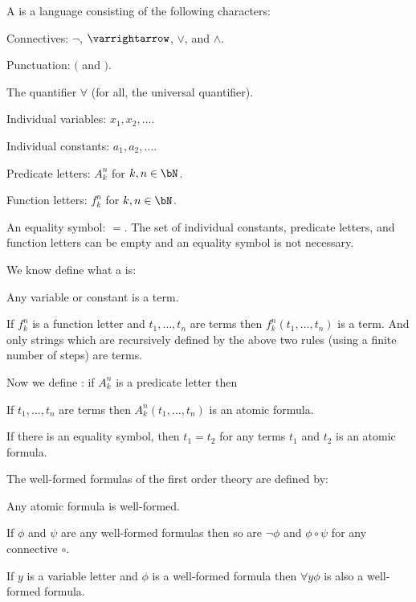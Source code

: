 \documentclass[10pt]{article}
\let\to=\varrightarrow
\begin{document}
\begin{defn*}

    A  is a language consisting of the following characters:
    \benum
        \item Connectives: $\neg$, $\to$, $\lor$, and $\land$.
        \item Punctuation: $($ and $)$.
        \item The quantifier $\forall$ (for all, the universal quantifier).
        \item Individual variables: $x_1,x_2,\dots$.
        \item Individual constants: $a_1,a_2,\dots$.
        \item Predicate letters: $A_k^n$ for $k,n\in\bN$.
        \item Function letters: $f_k^n$ for $k,n\in\bN$.
        \item An equality symbol: $=$.
    \eenum
    The set of individual constants, predicate letters, and function letters can be empty and an equality symbol is not necessary.

    We know define what a  is:
    \benum
        \item Any variable or constant is a term.
        \item If $f_k^n$ is a function letter and $t_1,\dots,t_n$ are terms then $f_k^n(t_1,\dots,t_n)$ is a term.
    \eenum
    And only strings which are recursively defined by the above two rules (using a finite number of steps) are terms.
        
    Now we define : if $A_k^n$ is a predicate letter then
    \benum
        \item If $t_1,\dots,t_n$ are terms then $A_k^n(t_1,\dots,t_n)$ is an atomic formula.
        \item If there is an equality symbol, then $t_1=t_2$ for any terms $t_1$ and $t_2$ is an atomic formula.
    \eenum

    The well-formed formulas of the first order theory are defined by:
    \benum
        \item Any atomic formula is well-formed.
        \item If $\phi$ and $\psi$ are any well-formed formulas then so are $\neg\phi$ and $\phi\circ\psi$ for any connective $\circ$.
        \item If $y$ is a variable letter and $\phi$ is a well-formed formula then $\forall y\phi$ is also a well-formed formula.
    \eenum

\end{defn*}
\end{document}
